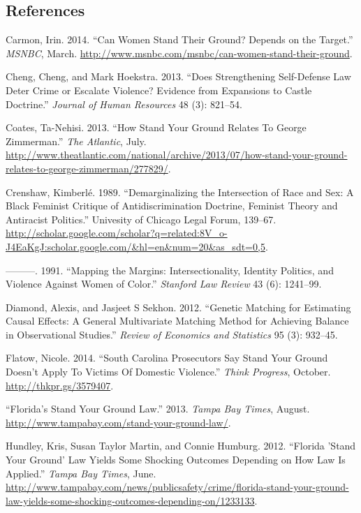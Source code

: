 \documentclass[12pt,article]{article}
\begin{document}
\setlength\parindent{0pt}

\subsection*{References}\label{references}

Carmon, Irin. 2014. ``Can Women Stand Their Ground? Depends on the
Target.'' \emph{MSNBC}, March.
\url{http://www.msnbc.com/msnbc/can-women-stand-their-ground}.

Cheng, Cheng, and Mark Hoekstra. 2013. ``Does Strengthening Self-Defense
Law Deter Crime or Escalate Violence? Evidence from Expansions to Castle
Doctrine.'' \emph{Journal of Human Resources} 48 (3): 821--54.

Coates, Ta-Nehisi. 2013. ``How Stand Your Ground Relates To George
Zimmerman.'' \emph{The Atlantic}, July.
\url{http://www.theatlantic.com/national/archive/2013/07/how-stand-your-ground-relates-to-george-zimmerman/277829/}.

Crenshaw, Kimberl{é}. 1989. ``Demarginalizing the Intersection of Race
and Sex: A Black Feminist Critique of Antidiscrimination Doctrine,
Feminist Theory and Antiracist Politics.'' Univesity of Chicago Legal
Forum, 139--67.
\url{http://scholar.google.com/scholar?q=related:8V_o-J4EaKgJ:scholar.google.com/\&hl=en\&num=20\&as_sdt=0,5}.

---------. 1991. ``Mapping the Margins: Intersectionality, Identity
Politics, and Violence Against Women of Color.'' \emph{Stanford Law
Review} 43 (6): 1241--99.

Diamond, Alexis, and Jasjeet S Sekhon. 2012. ``Genetic Matching for
Estimating Causal Effects: A General Multivariate Matching Method for
Achieving Balance in Observational Studies.'' \emph{Review of Economics
and Statistics} 95 (3): 932--45.

Flatow, Nicole. 2014. ``South Carolina Prosecutors Say Stand Your Ground
Doesn't Apply To Victims Of Domestic Violence.'' \emph{Think Progress},
October. \url{http://thkpr.gs/3579407}.

``Florida's Stand Your Ground Law.'' 2013. \emph{Tampa Bay Times},
August. \url{http://www.tampabay.com/stand-your-ground-law/}.

Hundley, Kris, Susan Taylor Martin, and Connie Humburg. 2012. ``Florida
'Stand Your Ground' Law Yields Some Shocking Outcomes Depending on How
Law Is Applied.'' \emph{Tampa Bay Times}, June.
\url{http://www.tampabay.com/news/publicsafety/crime/florida-stand-your-ground-law-yields-some-shocking-outcomes-depending-on/1233133}.
\end{document}
